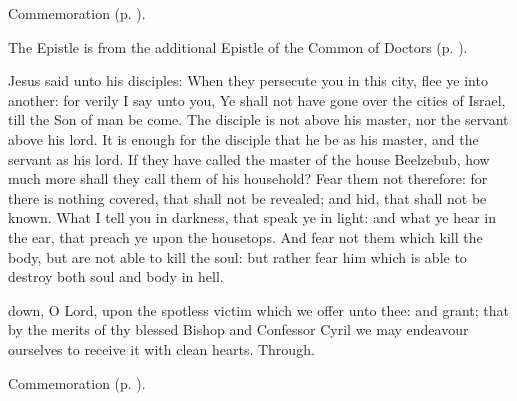 \begin{rubric}
	Commemoration  (p. \pageref{EdwardCollect}).
\end{rubric}

\begin{rubric}
	The Epistle is from the additional Epistle of the Common of Doctors (p. \pageref{CommonDoctorsSecondEpistle}).
\end{rubric}


 Jesus said unto his disciples: When they persecute you in this city, flee ye into another: for verily I say unto you, Ye shall not have gone over the cities of Israel, till the Son of man be come. The disciple is not above his master, nor the servant above his lord. It is enough for the disciple that he be as his master, and the servant as his lord. If they have called the master of the house Beelzebub, how much more shall they call them of his household? Fear them not therefore: for there is nothing covered, that shall not be revealed; and hid, that shall not be known. What I tell you in darkness, that speak ye in light: and what ye hear in the ear, that preach ye upon the housetops. And fear not them which kill the body, but are not able to kill the soul: but rather fear him which is able to destroy both soul and body in hell.


\secret\label{CyrilSecret}
 down, O Lord, upon the spotless victim which we offer unto thee: and grant; that by the merits of thy blessed Bishop and Confessor Cyril we may endeavour ourselves to receive it with clean hearts. Through.

\begin{rubric}
	Commemoration  (p. \pageref{EdwardSecret}).
\end{rubric}


